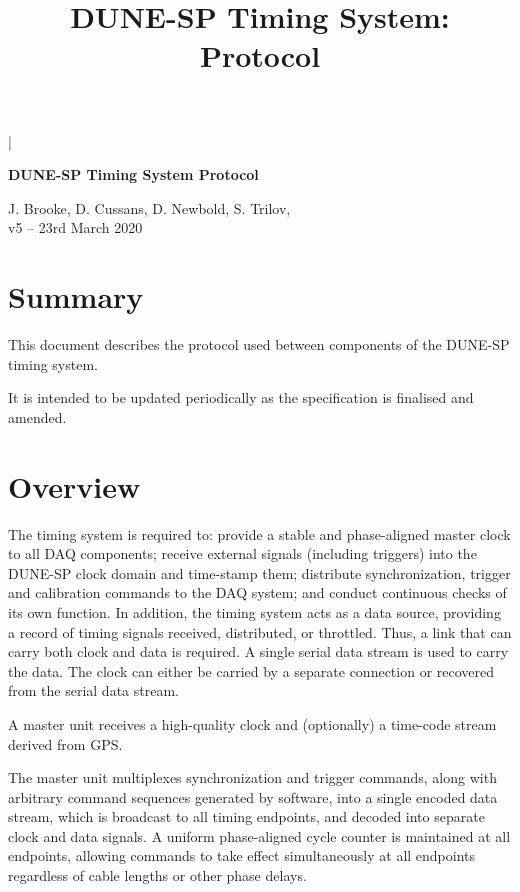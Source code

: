 \documentclass[a4paper,11pt]{article}
\begin{document}

\lstMakeShortInline[columns=fixed]|

\title{DUNE-SP Timing System: Protocol}
\begin{center}
{\LARGE\bf DUNE-SP Timing System Protocol}
\vspace{1cm}

J. Brooke, D. Cussans, D. Newbold, S. Trilov, \\
\vspace*{1ex}
v5 -- 23rd March 2020
\end{center}
\vspace*{\fill}
\setcounter{tocdepth}{1}
\tableofcontents
\vspace*{\fill}

\section*{Summary}

This document describes the protocol used between components of the DUNE-SP timing system. 

It is intended to be updated periodically as the specification is finalised and amended.

\newpage
\section{Overview}

The timing system is required to: provide a stable and phase-aligned
master clock to all DAQ components; receive external signals (including triggers)
into the DUNE-SP clock domain and time-stamp them; distribute synchronization,
trigger and calibration commands to the DAQ system; and conduct continuous
checks of its own function. In addition, the timing system acts as a
data source, providing a record of timing signals received, distributed, or
throttled. Thus, a link that can carry both clock and data is required. A single serial data stream is used to carry the data. The clock can either be carried by a separate connection or recovered from the serial data stream.

A master unit receives a high-quality clock and (optionally) a time-code stream derived from GPS. 

The master unit multiplexes
synchronization and trigger commands, along with arbitrary command
sequences generated by software, into a single encoded data stream,
which is broadcast to all timing endpoints, and decoded into separate clock
and data signals. A uniform phase-aligned cycle counter is maintained at all endpoints,
allowing commands to take effect simultaneously at all endpoints
regardless of cable lengths or other phase delays.
\end{document}

